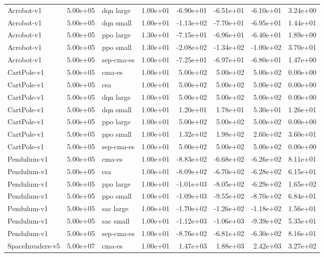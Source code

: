 \begin{longtable}{lrlrrrrr}
Acrobot-v1 & 5.00e+05 & dqn large & 1.00e+01 & -6.90e+01 & -6.51e+01 & -6.10e+01 & 3.24e+00 \\
Acrobot-v1 & 5.00e+05 & dqn small & 1.00e+01 & -1.13e+02 & -7.70e+01 & -6.95e+01 & 1.44e+01 \\
Acrobot-v1 & 5.00e+05 & ppo large & 1.30e+01 & -7.15e+01 & -6.96e+01 & -6.40e+01 & 1.89e+00 \\
Acrobot-v1 & 5.00e+05 & ppo small & 1.30e+01 & -2.08e+02 & -1.34e+02 & -1.00e+02 & 3.70e+01 \\
Acrobot-v1 & 5.00e+05 & sep-cma-es & 1.00e+01 & -7.25e+01 & -6.97e+01 & -6.80e+01 & 1.47e+00 \\
CartPole-v1 & 5.00e+05 & cma-es & 1.00e+01 & 5.00e+02 & 5.00e+02 & 5.00e+02 & 0.00e+00 \\
CartPole-v1 & 5.00e+05 & csa & 1.00e+01 & 5.00e+02 & 5.00e+02 & 5.00e+02 & 0.00e+00 \\
CartPole-v1 & 5.00e+05 & dqn large & 1.00e+01 & 5.00e+02 & 5.00e+02 & 5.00e+02 & 0.00e+00 \\
CartPole-v1 & 5.00e+05 & dqn small & 1.00e+01 & 1.20e+01 & 1.78e+01 & 5.30e+01 & 1.26e+01 \\
CartPole-v1 & 5.00e+05 & ppo large & 1.00e+01 & 5.00e+02 & 5.00e+02 & 5.00e+02 & 0.00e+00 \\
CartPole-v1 & 5.00e+05 & ppo small & 1.00e+01 & 1.32e+02 & 1.98e+02 & 2.60e+02 & 3.60e+01 \\
CartPole-v1 & 5.00e+05 & sep-cma-es & 1.00e+01 & 5.00e+02 & 5.00e+02 & 5.00e+02 & 0.00e+00 \\
Pendulum-v1 & 5.00e+05 & cma-es & 1.00e+01 & -8.83e+02 & -6.68e+02 & -6.26e+02 & 8.11e+01 \\
Pendulum-v1 & 5.00e+05 & csa & 1.00e+01 & -8.09e+02 & -6.70e+02 & -6.28e+02 & 6.15e+01 \\
Pendulum-v1 & 5.00e+05 & ppo large & 1.00e+01 & -1.01e+03 & -8.05e+02 & -6.29e+02 & 1.65e+02 \\
Pendulum-v1 & 5.00e+05 & ppo small & 1.00e+01 & -1.09e+03 & -9.55e+02 & -8.70e+02 & 6.84e+01 \\
Pendulum-v1 & 5.00e+05 & sac large & 1.00e+01 & -1.70e+02 & -1.26e+02 & -1.18e+02 & 1.56e+01 \\
Pendulum-v1 & 5.00e+05 & sac small & 1.00e+01 & -1.12e+03 & -1.06e+03 & -9.39e+02 & 5.35e+01 \\
Pendulum-v1 & 5.00e+05 & sep-cma-es & 1.00e+01 & -8.76e+02 & -6.81e+02 & -6.30e+02 & 8.16e+01 \\
SpaceInvaders-v5 & 5.00e+07 & cma-es & 1.00e+01 & 1.47e+03 & 1.88e+03 & 2.42e+03 & 3.27e+02 \\

\end{longtable}
